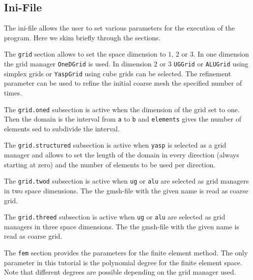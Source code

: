 \documentclass[a4paper,12pt]{article}
\begin{document}
\subsection{Ini-File}

The ini-file allows the user to set various parameters for the
execution of the program. Here we skim briefly through the sections.


The \lstinline{grid} section allows to set the space dimension to $1$, $2$ or $3$.
In one dimension the grid manager \lstinline{OneDGrid} is used.
In dimension $2$ or $3$ \lstinline{UGGrid} or \lstinline{ALUGrid} 
using simplex grids or \lstinline{YaspGrid} using cube grids can be selected.
The refinement parameter can be used to refine the initial coarse
mesh the specified number of times.


The \lstinline{grid.oned} subsection is active when the dimension
of the grid set to one. Then the domain is the interval from \lstinline{a}
to \lstinline{b} and \lstinline{elements} gives the number of elements
sed to subdivide the interval.


The \lstinline{grid.structured} subsection is active when \lstinline{yasp}
is selected as a grid manager and allows to set the length of the domain
in every direction (always starting at zero) and the number of elements
to be used per direction. 


The \lstinline{grid.twod} subsection is active when \lstinline{ug}
or \lstinline{alu} are selected as grid managers in two space dimensions.
The the gmsh-file with the given name is read as coarse grid.


The \lstinline{grid.threed} subsection is active when \lstinline{ug}
or \lstinline{alu} are selected as grid managers in three space dimensions.
The the gmsh-file with the given name is read as coarse grid.


The \lstinline{fem} section provides the parameters for the finite
element method. The only parameter in this tutorial is the polynomial
degree for the finite element space. Note that different degrees
are possible depending on the grid manager used.
\end{document}
